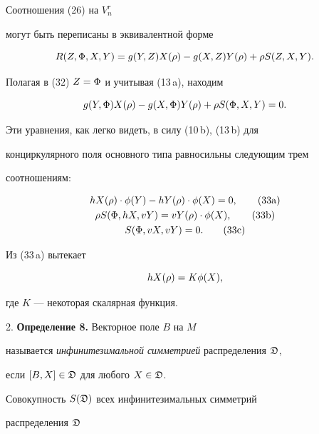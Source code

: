 Соотношения (26) на $V^r_n$


могут быть переписаны в эквивалентной форме


\begin{equation}


R(Z,\F,X,Y)=g(Y,Z)X(\ro) -g(X,Z)Y(\ro) +\ro S(Z,X,Y).


\end{equation}


Полагая в (32) $Z=\Phi$ и учитывая (13\,a), находим


$$


g(Y,\F)X(\ro) - g(X,\F)Y(\ro) + \ro S(\F,X,Y)=0.


$$


Эти уравнения, как легко видеть, в силу (10\,b), (13\,b) для


конциркулярного поля основного типа равносильны следующим трем


соотношениям:


\begin{gather}


{hX}(\ro)\cdot \f(Y) -{hY}(\ro )\cdot \f(X)=0,\tag{33\text{a}} \\


\ro S(\F,hX,vY)={vY}(\ro)\cdot \f(X),\tag{33\text{b}}\\


S(\F,vX,vY)=0.\tag{33\text{c}}


\end{gather}


\addtocounter{equation}{1}


Из (33\,a) вытекает


\begin{equation}


{hX}(\ro)=K\f(X),


\end{equation}


где $K$ --- некоторая скалярная функция.


\medskip





2. {\bf Определение 8.} Векторное поле $B$ на $M$


называется {\it инфинитезимальной симметрией} распределения $ \frak D$,


если $[B,X]\in\frak D$ для любого $X\in \frak D $.


Совокупность $S(\frak D)$ всех инфинитезимальных симметрий


распределения $\frak D$


